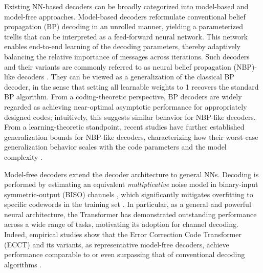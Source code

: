 \documentclass[lettersize,onecolumn]{IEEEtran}
\begin{document}
Existing NN-based decoders can be broadly categorized into model-based and model-free approaches. Model-based decoders reformulate conventional belief propagation (BP) decoding in an unrolled manner, yielding a parameterized trellis that can be interpreted as a feed-forward neural network. This network enables end-to-end learning of the decoding parameters, thereby adaptively balancing the relative importance of messages across iterations. Such decoders and their variants are commonly referred to as neural belief propagation (NBP)-like decoders \cite{nachmani2016learningNBPconference,nachmani2018deeplearningNBP,lugosch2017neuraloffsetNBP,buchberger2020pruningNBPJSAC,dai2021learningtodecodeprotographldpcNBP,chen2021cyclicallyNBP,zhang2024section-wiseNPBforQCLDPC}. They can be viewed as a generalization of the classical BP decoder, in the sense that setting all learnable weights to 1 recovers the standard BP algorithm. From a coding-theoretic perspective, BP decoders are widely regarded as achieving near-optimal asymptotic performance for appropriately designed codes; intuitively, this suggests similar behavior for NBP-like decoders.
From a learning-theoretic standpoint, recent studies have further established generalization bounds for NBP-like decoders, characterizing how their worst-case generalization behavior scales with the code parameters and the model complexity \cite{adiga2024generalizationboundforNBP}.

Model-free decoders extend the decoder architecture to general NNs. Decoding is performed by estimating an equivalent \emph{multiplicative} noise model in binary-input symmetric-output (BISO) channels \cite{richardson2002LDPCcapacityundermessagepassingdecoding}, which significantly mitigates overfitting to specific codewords in the training set \cite{bennatan2018syndromebasedapproach}. In particular, as a general and powerful neural architecture, the Transformer\cite{vaswani2017attentionisallyouneed} has demonstrated outstanding performance across a wide range of tasks, motivating its adoption for channel decoding. Indeed, empirical studies show that the Error Correction Code Transformer (ECCT) and its variants, as representative model-free decoders, achieve performance comparable to or even surpassing that of conventional decoding algorithms \cite{choukroun2022ECCT,park2025crossmpt,lau2025interplayBPandTransformerECCT,park2025multipleMasktforECCT}.
\end{document}
